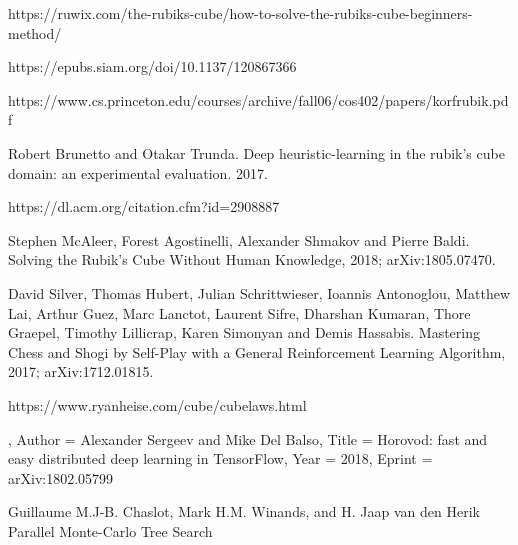 \documentclass[10pt,twocolumn,letterpaper]{article}
\begin{document}



\begin{thebibliography}{9}

\bibitem{}
https://ruwix.com/the-rubiks-cube/how-to-solve-the-rubiks-cube-beginners-method/

\bibitem{}
https://epubs.siam.org/doi/10.1137/120867366

\bibitem{}
https://www.cs.princeton.edu/courses/archive/fall06/cos402/papers/korfrubik.pdf

\bibitem{}
Robert Brunetto and Otakar Trunda. Deep heuristic-learning in the rubik’s cube domain: an experimental evaluation. 2017.

\bibitem{}
https://dl.acm.org/citation.cfm?id=2908887

Stephen McAleer, Forest Agostinelli, Alexander Shmakov and Pierre Baldi.
\newblock Solving the Rubik's Cube Without Human Knowledge, 2018;
\newblock arXiv:1805.07470.

David Silver, Thomas Hubert, Julian Schrittwieser, Ioannis Antonoglou, Matthew Lai, Arthur Guez, Marc Lanctot, Laurent Sifre, Dharshan Kumaran, Thore Graepel, Timothy Lillicrap, Karen Simonyan and Demis Hassabis.
\newblock Mastering Chess and Shogi by Self-Play with a General Reinforcement Learning Algorithm, 2017;
\newblock arXiv:1712.01815.

\bibitem{}
https://www.ryanheise.com/cube/cube\textunderscore laws.html

,
Author = {Alexander Sergeev and Mike Del Balso},
Title = {Horovod: fast and easy distributed deep learning in TensorFlow},
Year = {2018},
Eprint = {arXiv:1802.05799}

\bibitem{}
\newblock Guillaume M.J-B. Chaslot, Mark H.M. Winands, and H. Jaap van den Herik
\newblock Parallel Monte-Carlo Tree Search

\end{thebibliography}

{\small


}
\end{document}
